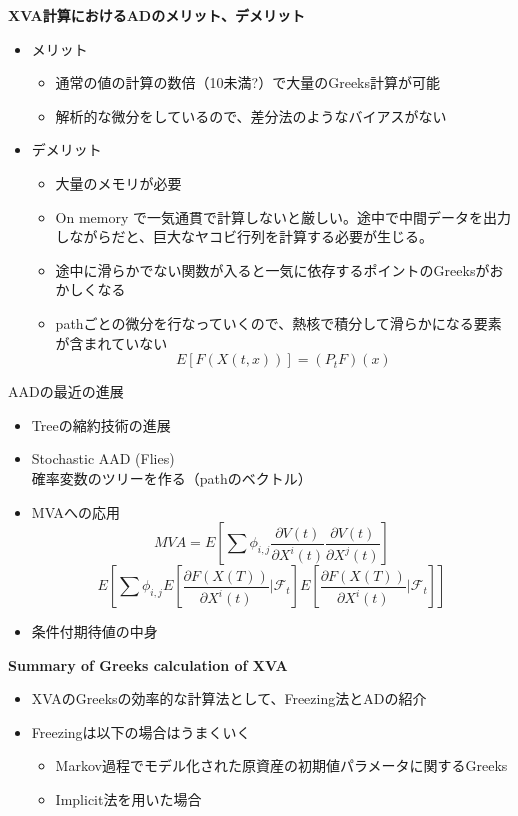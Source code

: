 \documentclass[driverfallback=dvipdfmx,cjk]{beamer}
\begin{document}
\begin{frame}\textbf{XVA計算におけるADのメリット、デメリット}\\
    \begin{itemize}
    \item メリット
    \begin{itemize}
        \item 通常の値の計算の数倍（10未満?）で大量のGreeks計算が可能
        \item 解析的な微分をしているので、差分法のようなバイアスがない
    \end{itemize}
    \item デメリット
    \begin{itemize}
        \item 大量のメモリが必要
        \item On memory で一気通貫で計算しないと厳しい。途中で中間データを出力しながらだと、巨大なヤコビ行列を計算する必要が生じる。　
        \item 途中に滑らかでない関数が入ると一気に依存するポイントのGreeksがおかしくなる
        \item pathごとの微分を行なっていくので、熱核で積分して滑らかになる要素が含まれていない
        $$ E[F(X(t, x))] = (P_t F)(x)$$
    \end{itemize}
    \end{itemize}

\end{frame}

\begin{frame}
    AADの最近の進展
    \begin{itemize}
        \item Treeの縮約技術の進展
        \item Stochastic AAD (Flies) \\
        確率変数のツリーを作る（pathのベクトル）
        \item MVAへの応用
        $$MVA =E[ \sum \phi_{i,j} \frac{\partial V(t)}{\partial X^i(t)} \frac{\partial V(t)}{\partial X^j(t)}]$$
        $$E\left[ \sum \phi_{i,j}  E\left[ \frac{\partial F(X(T))}{\partial X^i(t)} | \mathcal{F}_t\right] E\left[ \frac{\partial F(X(T))}{\partial X^i(t)} | \mathcal{F}_t \right] \right]$$
        \item 条件付期待値の中身
    \end{itemize}
\end{frame}

\begin{frame}
  \textbf{Summary of Greeks calculation of XVA}  
  \begin{itemize}
      \item XVAのGreeksの効率的な計算法として、Freezing法とADの紹介
      \item Freezingは以下の場合はうまくいく
      \begin{itemize}
          \item Markov過程でモデル化された原資産の初期値パラメータに関するGreeks
          \item Implicit法を用いた場合
      \end{itemize}
  \end{itemize}
\end{frame}
\end{document}
